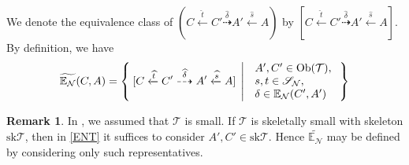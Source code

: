 \documentclass[a4paper,reqno,10pt]{amsart}
\theoremstyle{definition}
\theoremstyle{definition}
\newtheorem{remark}[remark]{Remark}
\theoremstyle{definition}
\theoremstyle{definition}
\theoremstyle{plain}
\newcommand{\BE}{\mathbb{E}}
\newcommand{\CN}{\mathcal{N}}
\newcommand{\CT}{\mathcal{T}}
\renewcommand{\SS}{\mathscr{S}}
\begin{document}
We denote the equivalence class of $(C\xleftarrow{\widehat{t}}C'\overset{\widehat{\delta}}{\dashrightarrow}A'\xleftarrow{\widehat{s}}A)$ by $[C\xleftarrow{\widehat{t}}C'\overset{\widehat{\delta}}{\dashrightarrow}A'\xleftarrow{\widehat{s}}A]$.
By definition, we have
\begin{equation}\label{ENT}
\widetilde{\BE_{\CN}}(C,A)=\Set{[C\xleftarrow{\widehat{t}}C'\overset{\widehat{\delta}}{\dashrightarrow}A'\xleftarrow{\widehat{s}}A]\,|\, \begin{array}{l}A',C'\in\Ob(\CT),\\ s,t\in\SS_{\CN},\\  \delta\in\BE_{\CN}(C',A')\end{array}}
\end{equation}


\begin{remark}
In \cite{NOS22}, we assumed that $\CT$ is small.
If $\CT$ is skeletally small with skeleton $\mathrm{sk}\CT$, then in \eqref{ENT} it suffices to consider $A',C'\in\mathrm{sk}\CT$. 
Hence $\widetilde{\BE_{\CN}}$ may be defined by considering only such representatives.
\end{remark}

\normalcolor
\end{document}
